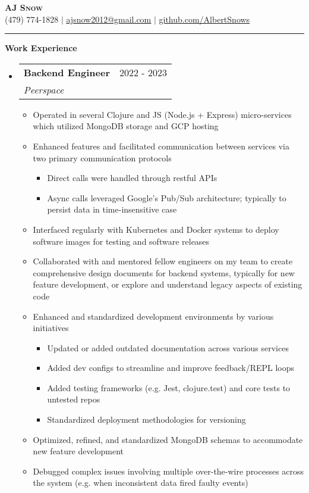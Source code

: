 \documentclass[letterpaper,11pt]{article}
\makeatletter
\newcommand{\resumeItem}[1]{
  \item\small{
    {#1 \vspace{-2pt}}
  }
}
\newcommand{\resumeSubheading}[4]{
  \vspace{-2pt}\item
    \begin{tabular*}{0.97\textwidth}[t]{l@{\extracolsep{\fill}}r}
      \textbf{#1} & #2 \\
      \textit{\small#3} & \textit{\small #4} \\
    \end{tabular*}\vspace{0pt}
}
\newcommand{\resumeSubHeadingListStart}{\begin{itemize}[leftmargin=0.15cm, label={}]}
\newcommand{\resumeSubHeadingListEnd}{\end{itemize}}
\newcommand{\resumeItemListStart}{\begin{itemize}}
\newcommand{\resumeItemListEnd}{\end{itemize}\vspace{-5pt}}
\makeatother
\begin{document}
\textbf{\scshape \Large \textcolor{magic_blue}{AJ Snow}} \\ \vspace{3pt}
\small (479) 774-1828 $|$ \href{mailto:ajsnow2012@gmail.com}
{\underline{ajsnow2012@gmail.com}} $|$ 
\href{https://github.com/AlbertSnows}{\underline{github.com/AlbertSnows}}
\noindent\rule{19.5cm}{0.4pt}

\textbf{\large \textcolor{magic_blue}{Work Experience}}
\resumeSubHeadingListStart
    \resumeSubheading
      {Backend Engineer}{2022 - 2023}
      {Peerspace}{}
      \resumeItemListStart
        \resumeItem{Operated in several Clojure and JS (Node.js + Express) micro-services which utilized MongoDB storage and GCP hosting}
        \resumeItem{Enhanced features and facilitated communication between services via two primary communication protocols}
            \begin{itemize}
                \item Direct calls were handled through restful APIs
                \item Async calls leveraged Google's Pub/Sub architecture; typically to persist data in time-insensitive case
            \end{itemize}
        \resumeItem{Interfaced regularly with Kubernetes and Docker systems to deploy software images for testing and software releases}
        \resumeItem{Collaborated with and mentored fellow engineers on my team to create comprehensive design documents for backend systems,  typically for new feature development, or explore and understand legacy aspects of existing code}
        \resumeItem{Enhanced and standardized development environments by various initiatives}
        \begin{itemize}
            \item Updated or added outdated documentation across various services
            \item Added dev configs to streamline and improve feedback/REPL loops
            \item Added testing frameworks (e.g. Jest, clojure.test) and core tests to untested repos 
            \item Standardized deployment methodologies for versioning
        \end{itemize}
        \resumeItem{Optimized, refined, and standardized MongoDB schemas to accommodate new feature development}
        \resumeItem{Debugged complex issues involving multiple over-the-wire processes across the system (e.g. when inconsistent data fired faulty events) }
        \resumeItemListEnd
    \resumeSubHeadingListEnd
\end{document}
